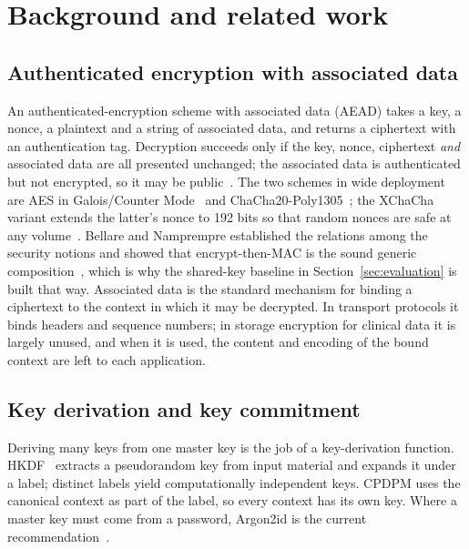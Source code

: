\section{Background and related work}
\label{sec:background}

\subsection{Authenticated encryption with associated data}

An authenticated-encryption scheme with associated data (AEAD) takes a key, a nonce, a plaintext and a string of associated data, and returns a ciphertext with an authentication tag. Decryption succeeds only if the key, nonce, ciphertext \emph{and} associated data are all presented unchanged; the associated data is authenticated but not encrypted, so it may be public~\cite{rogaway2002aead,rfc5116}. The two schemes in wide deployment are AES in Galois/Counter Mode~\cite{nist-gcm} and ChaCha20-Poly1305~\cite{rfc8439}; the XChaCha variant extends the latter's nonce to 192 bits so that random nonces are safe at any volume~\cite{xchacha-draft}. Bellare and Namprempre established the relations among the security notions and showed that encrypt-then-MAC is the sound generic composition~\cite{bellare2000ae}, which is why the shared-key baseline in Section~\ref{sec:evaluation} is built that way. Associated data is the standard mechanism for binding a ciphertext to the context in which it may be decrypted. In transport protocols it binds headers and sequence numbers; in storage encryption for clinical data it is largely unused, and when it is used, the content and encoding of the bound context are left to each application.

\subsection{Key derivation and key commitment}

Deriving many keys from one master key is the job of a key-derivation function. HKDF~\cite{rfc5869,krawczyk2010hkdf} extracts a pseudorandom key from input material and expands it under a label; distinct labels yield computationally independent keys. CPDPM uses the canonical context as part of the label, so every context has its own key. Where a master key must come from a password, Argon2id is the current recommendation~\cite{rfc9106}.


